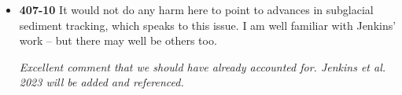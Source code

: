 \documentclass[11pt]{article}
\begin{document}
\begin{itemize}
  
\item \textbf{407-10} It would not do any harm here to point to advances in subglacial sediment
  tracking, which speaks to this issue. I am well familiar with Jenkins’ work –
  but there may well be others too.

  \textit{Excellent comment that we should have already accounted for. Jenkins et al. 2023 will be added and referenced.}
  
\end{itemize}

 

\end{document}
